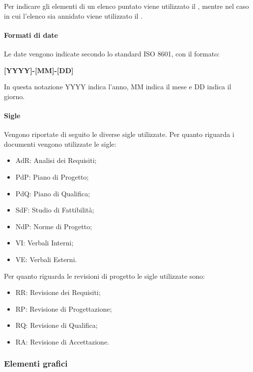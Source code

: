 Per indicare gli elementi di un elenco puntato viene utilizzato il , mentre nel caso in cui l'elenco
sia annidato viene utilizzato il .

\paragraph{Formati di date}
\label{par:date}

Le date vengono indicate secondo lo standard \textsc{ISO 8601}, con il formato:
\begin{center}
    \textbf{[YYYY]-[MM]-[DD]}
\end{center}
In questa notazione YYYY indica l'anno, MM indica il mese e DD indica il giorno.

\paragraph{Sigle}
\label{par:sigle}

Vengono riportate di seguito le diverse sigle utilizzate.
Per quanto riguarda i documenti vengono utilizzate le sigle:
\begin{itemize}
    \item AdR: Analisi dei Requisiti;
    \item PdP: Piano di Progetto;
    \item PdQ: Piano di Qualifica;
    \item SdF: Studio di Fattibilità;
    \item NdP: Norme di Progetto;
    \item VI: Verbali Interni;
    \item VE: Verbali Esterni.
\end{itemize}

Per quanto riguarda le revisioni di progetto le sigle utilizzate sono:
\begin{itemize}
    \item RR: Revisione dei Requisiti;
    \item RP: Revisione di Progettazione;
    \item RQ: Revisione di Qualifica;
    \item RA: Revisione di Accettazione.
\end{itemize}

\subsubsection{Elementi grafici}
\label{ssub:elementi_grafici}

